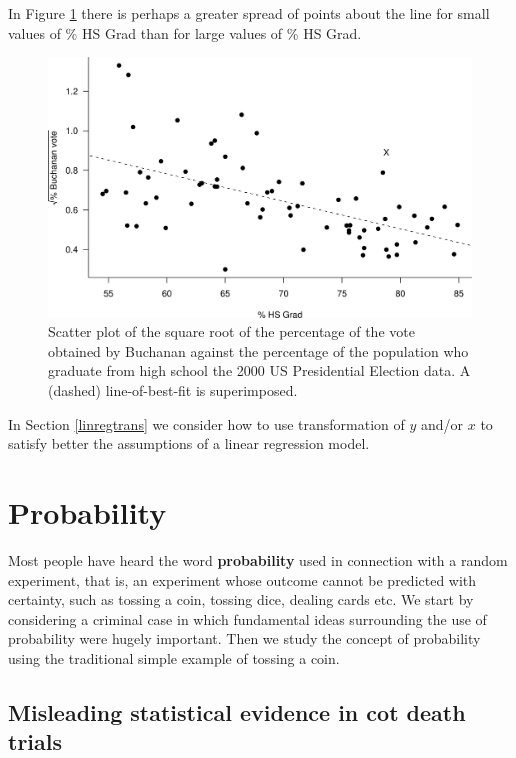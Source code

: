 \documentclass[
  11pt,
  british,
  openany, a4paper]{book}
\begin{document}
In Figure \ref{fig:electionHS3} there is perhaps a greater spread of points about the line for small values of \% HS Grad than for large values of \% HS Grad.

\begin{figure}

{\centering \includegraphics[width=0.75\linewidth]{images/election_HS3} 

}

\caption{Scatter plot of the square root of the percentage of the vote obtained by Buchanan against the percentage of the population who graduate from high school the 2000 US Presidential Election data.  A (dashed) line-of-best-fit is superimposed.}\label{fig:electionHS3}
\end{figure}

In Section \ref{linregtrans} we consider how to use transformation of \(y\) and/or \(x\) to satisfy better the assumptions of a linear regression model.

\hypertarget{probability}{%
\chapter{Probability}\label{probability}}

Most people have heard the word \textbf{probability} used in connection with a random experiment, that is, an experiment whose outcome cannot be predicted with certainty, such as tossing a coin, tossing dice, dealing cards etc. We start by considering a criminal case in which fundamental ideas surrounding the use of probability were hugely important. Then we study the concept of probability using the traditional simple example of tossing a coin.

\hypertarget{sids}{%
\section{Misleading statistical evidence in cot death trials}\label{sids}}
\end{document}
